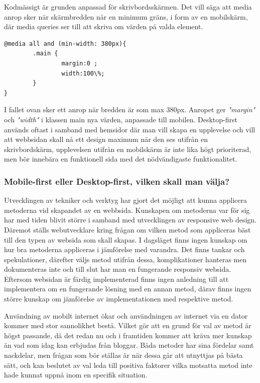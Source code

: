 \documentclass[11pt]{article}
\begin{document}
Kodmässigt är grunden anpassad för skrivbordsskärmen. Det vill säga att media anrop sker när skärmbredden når en minimum gräns, i form av en mobilskärm, där media queries ser till att skriva om värden på valda element.


\vspace{0.5cm}
 \begin{verbatim}
@media all and (min-width: 380px){
        .main {
                margin:0 ;
                width:100\%;
        }
}
\end{verbatim}
\vspace{0.5cm}

I fallet ovan sker ett anrop när bredden är som max 380px. Anropet ger \textit{"margin"} och \textit{"width"} i klassen main nya värden, anpassade till mobilen.  Desktop-first används oftast i samband med hemsidor där man vill skapa en upplevelse och vill att webbsidan skall nå ett design maximum när den ses utifrån en skrivbordskärm, upplevelsen utifrån en mobilskärm är inte lika högt prioriterad, men bör innebära en funktionell sida med det nödvändigaste funktionalitet.

\subsubsection{Mobile-first eller Desktop-first, vilken skall man välja?}
Utvecklingen av tekniker och verktyg har gjort det möjligt att kunna applicera metoderna vid skapandet av en webbsida. Kunskapen om metoderna var för sig har med tiden blivit större i samband med utvecklingen av responsive web design. Däremot ställs webutvecklare kring frågan om vilken metod som appliceras bäst till den typen av websida som skall skapas. I dagsläget finns ingen kunskap om hur bra metoderna appliceras i jämförelse med varandra. Det finns tankar och spekulationer, därefter väljs metod utifrån dessa, komplikationer hanteras men dokumenteras inte och till slut har man en fungerande responsiv websida. Eftersom websidan är färdig implementerad finns ingen anledning till att implementera om en fungerande lösning med en annan metod, därav finns ingen större kunskap om jämförelse av implementationen med respektive metod.

Användning av mobilt internet ökar och användningen av internet via en dator kommer med stor sannolikhet bestå. Vilket gör att en grund för val av metod är högst passande, då det redan nu och i framtiden kommer att kräva mer kunskap än vad som idag kan erbjudas från bloggar. Båda metoder har sina fördelar samt nackdelar, men frågan som bör ställas är när dessa går att utnyttjas på bästa sätt, och kan beslutet av val leda till positiva faktorer vilka motsatta metod inte hade kunnat uppnå inom en specifik situation.
\end{document}
